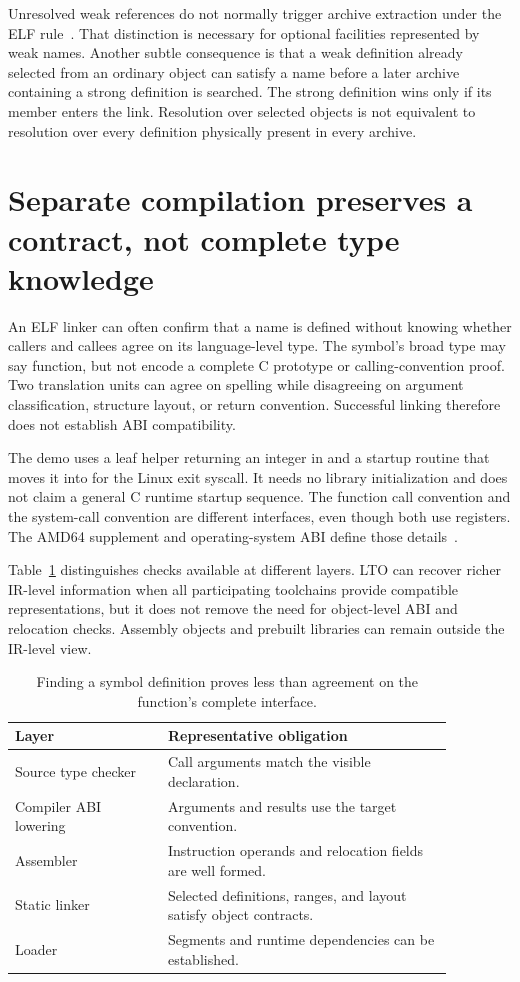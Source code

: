 Unresolved weak references do not normally trigger archive extraction under the ELF rule~\cite{xinuos-2026-elf}.
That distinction is necessary for optional facilities represented by weak names.
Another subtle consequence is that a weak definition already selected from an ordinary object can satisfy a name before a later archive containing a strong definition is searched.
The strong definition wins only if its member enters the link.
Resolution over selected objects is not equivalent to resolution over every definition physically present in every archive.

\section{Separate compilation preserves a contract, not complete type knowledge}
\label{sec:ch57-abi}

An ELF linker can often confirm that a name is defined without knowing whether callers and callees agree on its language-level type.
The symbol's broad type may say function, but not encode a complete C prototype or calling-convention proof.
Two translation units can agree on spelling while disagreeing on argument classification, structure layout, or return convention.
Successful linking therefore does not establish ABI compatibility.

The demo uses a leaf helper returning an integer in  and a startup routine that moves it into  for the Linux exit syscall.
It needs no library initialization and does not claim a general C runtime startup sequence.
The function call convention and the system-call convention are different interfaces, even though both use registers.
The AMD64 supplement and operating-system ABI define those details~\cite{matz-2012-amd64}.

Table~\ref{tab:ch57-checks} distinguishes checks available at different layers.
LTO can recover richer IR-level information when all participating toolchains provide compatible representations, but it does not remove the need for object-level ABI and relocation checks.
Assembly objects and prebuilt libraries can remain outside the IR-level view.

\begin{table}[htbp]
\caption{Finding a symbol definition proves less than agreement on the function's complete interface.}
\label{tab:ch57-checks}
\centering
\begin{tabular}{p{0.30\linewidth}p{0.57\linewidth}}
\toprule
Layer & Representative obligation \\
\midrule
Source type checker & Call arguments match the visible declaration. \\
Compiler ABI lowering & Arguments and results use the target convention. \\
Assembler & Instruction operands and relocation fields are well formed. \\
Static linker & Selected definitions, ranges, and layout satisfy object contracts. \\
Loader & Segments and runtime dependencies can be established. \\
\bottomrule
\end{tabular}
\end{table}

